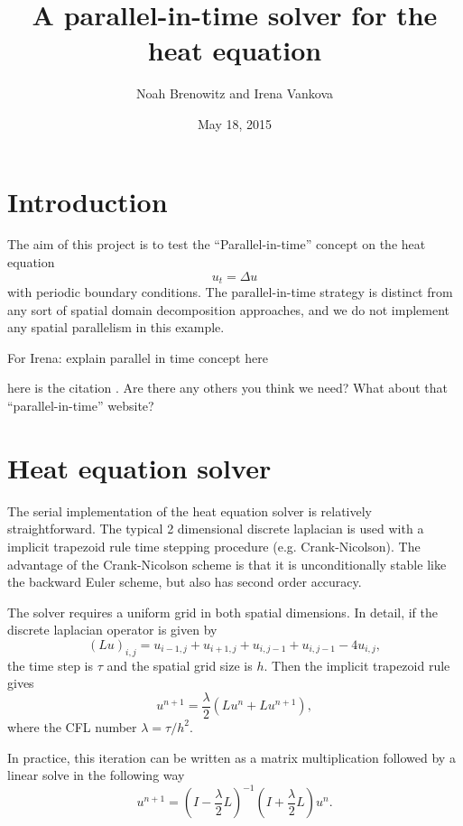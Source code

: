 \documentclass{article}
\title{A parallel-in-time solver for the heat equation}
\author{Noah Brenowitz and Irena Vankova}
\date{May 18, 2015}
\let\cite\citep
\begin{document}
\maketitle
\section{Introduction}
\label{sec:intro}

The aim of this project is to test the ``Parallel-in-time'' concept
on the heat equation 
\[ u_t = \Delta u \]
with periodic boundary conditions. 
The parallel-in-time strategy is distinct from any sort of spatial
domain decomposition approaches, and we do not implement any spatial
parallelism in this example. 

For Irena: explain parallel in time concept here

here is the citation \cite{falgout2014parallel}. Are there any others
you think we need? What about that ``parallel-in-time'' website?

\section{Heat equation solver}
\label{sec:ehat}

The serial implementation of the heat equation solver is relatively
straightforward. The typical 2 dimensional discrete laplacian is used
with a implicit trapezoid rule time stepping procedure
(e.g. Crank-Nicolson). The advantage of the Crank-Nicolson scheme is
that it is unconditionally stable like the backward Euler scheme, but
also has second order accuracy.

The solver requires a uniform grid in both
spatial dimensions. In detail, if the discrete laplacian operator is
given by
\[ (L u)_{i,j} = u_{i-1,j} + u_{i+1,j} + u_{i,j-1} + u_{i, j-1} - 4 u_{i,j}, \]
the time step is $\tau$ and the spatial grid size is $h$. Then the
implicit trapezoid rule gives
\[ u^{n+1}  = \frac{\lambda}{2} \left( Lu^n + Lu^{n+1} \right),\]
where the CFL number $\lambda = \tau / h^{2}$.

In practice, this iteration can be written as a matrix
multiplication followed by a linear solve in the following way
\begin{equation}
  \label{eq:time-step}
  u^{n+1} = \left( I- \frac{\lambda}{2} L \right)^{-1} \left(I+\frac{\lambda}{2}L \right) u^n.
\end{equation}
\end{document}
